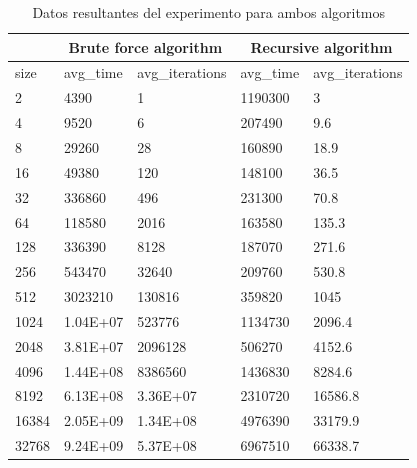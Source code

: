 \begin{table}[!htbp]
    \centering
    \begin{tabular}{|l|l|l|l|l|}
    \hline
        ~ & \multicolumn{2}{|c|}{Brute force algorithm} & \multicolumn{2}{|c|}{Recursive algorithm} \\ \hline
        size & avg\_time & avg\_iterations & avg\_time & avg\_iterations \\ \hline
        2 & 4390 & 1 & 1190300 & 3 \\ \hline
        4 & 9520 & 6 & 207490 & 9.6 \\ \hline
        8 & 29260 & 28 & 160890 & 18.9 \\ \hline
        16 & 49380 & 120 & 148100 & 36.5 \\ \hline
        32 & 336860 & 496 & 231300 & 70.8 \\ \hline
        64 & 118580 & 2016 & 163580 & 135.3 \\ \hline
        128 & 336390 & 8128 & 187070 & 271.6 \\ \hline
        256 & 543470 & 32640 & 209760 & 530.8 \\ \hline
        512 & 3023210 & 130816 & 359820 & 1045 \\ \hline
        1024 & 1.04E+07 & 523776 & 1134730 & 2096.4 \\ \hline
        2048 & 3.81E+07 & 2096128 & 506270 & 4152.6 \\ \hline
        4096 & 1.44E+08 & 8386560 & 1436830 & 8284.6 \\ \hline
        8192 & 6.13E+08 & 3.36E+07 & 2310720 & 16586.8 \\ \hline
        16384 & 2.05E+09 & 1.34E+08 & 4976390 & 33179.9 \\ \hline
        32768 & 9.24E+09 & 5.37E+08 & 6967510 & 66338.7 \\ \hline
    \end{tabular}
    \caption{Datos resultantes del experimento para ambos algoritmos}
    \label{fig:my_label}
\end{table}


